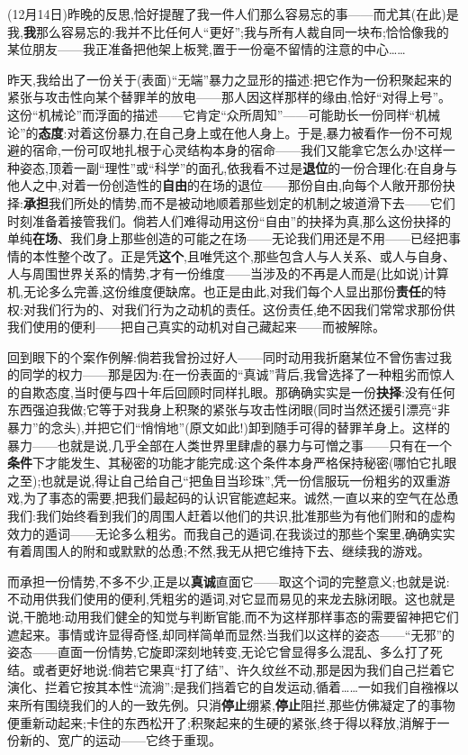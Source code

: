 \label{ch18:local:n50}

(12月14日)昨晚的反思,恰好提醒了我一件人们那么容易忘的事——而尤其(在此)是我,\textbf{我}那么容易忘的:我并不比任何人“更好”;我与所有人裁自同一块布;恰恰像我的某位朋友——我正准备把他架上板凳,置于一份毫不留情的注意的中心……

昨天,我给出了一份关于(表面)“无端”暴力之显形的描述:把它作为一份积聚起来\dmark{}的紧张与攻击性向某个替罪羊的放电——那人因这样那样的缘由,恰好“对得上号”。这份“机械论”而浮面的描述——它肯定“众所周知”——可能助长一份同样“机械论”的\textbf{态度}:对着这份暴力,在自己身上或在他人身上。于是,暴力被看作一份不可规避的宿命,一份可叹地扎根于心灵结构本身的宿命——我们又能拿它怎么办!这样一种姿态,顶着一副“理性”或“科学”的面孔,依我看不过是\textbf{退位}的一份合理化:在自身与他人之中,对着一份创造性的\textbf{自由}的在场的退位——那份自由,向每个人敞开那份抉择:\textbf{承担}我们所处的情势,而不是被动地顺着那些划定的机制之坡道滑下去——它们时刻准备着接管我们。倘若人们难得动用这份“自由”的抉择为真,那么这份抉择的单纯\textbf{在场}、我们身上那些创造的可能之在场——无论我们用还是不用——已经把事情的本性整个改了。正是凭\textbf{这个},且唯凭这个,那些包含人与人关系、或人与自身、人与周围世界关系的情势,才有一份维度——当涉及的不再是人而是(比如说)计算机,无论多么完善,这份维度便缺席。也正是由此,对我们每个人显出那份\textbf{责任}的特权:对我们行为的、对我们行为之动机的责任。这份责任,绝不因我们常常求那份供我们使用的便利——把自己真实的动机对自己藏起来——而被解除。

回到眼下的个案作例解:倘若我曾扮过好人——同时动用我折磨某位不曾伤害过我的同学的权力——那是因为:在一份表面的“真诚”背后,我曾选择了一种粗劣而惊人的自欺态度,当时便与四十年后回顾时同样扎眼。那确确实实是一份\textbf{抉择}:没有任何东西强迫我做;它等于对我身上积聚的紧张与攻击性闭眼(同时当然还援引漂亮“非暴力”的念头),并把它们“悄悄地”(原文如此!)卸到随手可得的替罪羊身上。这样的暴力——也就是说,几乎全部在人类世界里肆虐的暴力与可憎之事——只有在一个\textbf{条件}下才能发生、其秘密的功能才能完成:这个条件本身严格保持秘密(哪怕它\dmark{}扎眼之至);也就是说,得让自己给自己“把鱼目当珍珠”,凭一份信服玩一份粗劣的双重游戏,为了事态的需要,把我们最起码的认识官能遮起来。诚然,一直以来的空气在怂恿我们:我们始终看到我们的周围人赶着以他们的共识,批准那些为有他们附和的虚构效力的遁词——无论多么粗劣。而我自己的遁词,在我谈过的那些个案里,确确实实有着周围人的附和或默默的怂恿;不然,我无从把它维持下去、继续我的游戏。

而承担一份情势,不多不少,正是以\textbf{真诚}直面它——取这个词的完整意义;也就是说:不动用供我们使用的便利,凭粗劣的遁词,对它显而易见的来龙去脉闭眼。这也就是说,干脆地:动用我们健全的知觉与判断官能,而不为这样那样事态的需要留神把它们遮起来。事情或许显得奇怪,却同样简单而显然:当我们以这样的姿态——“无邪”的姿态——直面一份情势,它旋即深刻地转变,无论它曾显得多么混乱、多么打了死结。或者更好地说:倘若它果真“打了结”、许久纹丝不动,那是因为我们自己拦着它演化、拦着它按其本性“流淌”;是我们挡着它的自发运动,循着……一如我们自襁褓以来所有围绕我们的人的一致先例。只消\textbf{停止}绷紧,\textbf{停止}阻拦,那些仿佛凝定了的事物便重新动起来;卡住的东西松开了;积聚起来的生硬的紧张,终于得以释放,消解于一份新的、宽广的运动——它终于重现。

